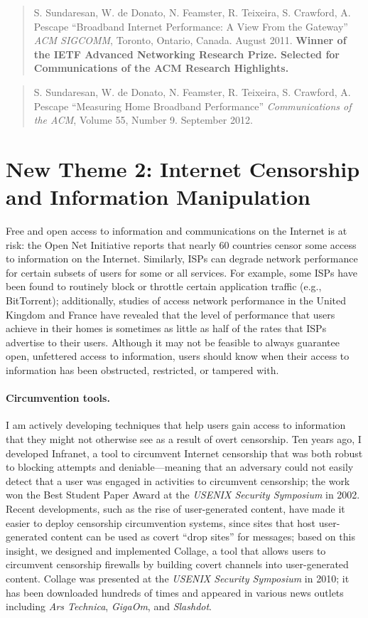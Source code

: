 \begin{quote}
S. Sundaresan, W. de Donato, N. Feamster, R. Teixeira, S. Crawford, A. Pescape 
``Broadband Internet Performance: A View From the Gateway''
{\em ACM SIGCOMM}, Toronto, Ontario, Canada. August 2011. {\bf Winner of
the IETF Advanced Networking Research Prize.  Selected for
Communications of the ACM Research Highlights.}
\end{quote}

\begin{quote}
S. Sundaresan, W. de Donato, N. Feamster, R. Teixeira, S. Crawford, A. Pescape 
``Measuring Home Broadband Performance''
{\em Communications of the ACM}, Volume 55, Number 9.  September 2012.
\end{quote}


\section*{New Theme 2: Internet Censorship and Information Manipulation}

Free and open access to information and communications on the Internet
is at risk: the Open Net Initiative reports that nearly 60 countries
censor some access to information on the Internet.  Similarly, ISPs can
degrade network performance for certain subsets of users for some or all
services.  For example, some ISPs have been found to routinely block or
throttle certain application traffic (e.g., BitTorrent); additionally,
studies of access network performance in the United Kingdom and France
have revealed that the level of performance that users achieve in their
homes is sometimes as little as half of the rates that ISPs advertise to
their users.  Although it may not be feasible to always guarantee open,
unfettered access to information, users should know when their access to
information has been obstructed, restricted, or tampered with.

\paragraph{Circumvention tools.}
I am actively developing techniques that help users gain access
to information that they might not otherwise see as a result of
overt censorship.  Ten years ago, I developed Infranet, a tool to
circumvent Internet censorship that was both robust to blocking attempts
and deniable---meaning that an adversary could not easily detect that a
user was engaged in activities to circumvent censorship; the work won
the Best Student Paper Award at the {\em USENIX Security Symposium} in
2002.  Recent developments, such as the rise of user-generated content,
have made it easier to deploy censorship circumvention systems, since
sites that host user-generated content can be used as covert ``drop
sites'' for messages; based on this insight, we designed and implemented
Collage, a tool that allows users to circumvent censorship firewalls by
building covert channels into user-generated content.  Collage was
presented at the {\em USENIX Security Symposium} in 2010; it has been
downloaded hundreds of times and appeared in various news outlets
including {\em Ars Technica}, {\em GigaOm}, and {\em Slashdot}.

